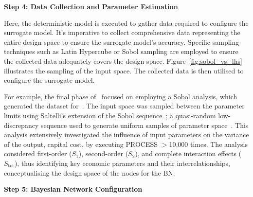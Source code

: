 \documentclass[journal]{IEEEtran}
\begin{document}
\textbf{Step 4: Data Collection and Parameter Estimation}

Here, the deterministic model is executed to gather data required to configure the surrogate model. It's imperative to collect comprehensive data representing the entire design space to ensure the surrogate model's accuracy. Specific sampling techniques such as Latin Hypercube or Sobol sampling are employed to ensure the collected data adequately covers the design space. Figure~\ref{fig:sobol_vs_lhs} illustrates the sampling of the input space. The collected data is then utilised to configure the surrogate model. 

For example, the final phase of~\cite{Hidalgo-Salaverri2023} focused on employing a Sobol analysis, which generated the dataset for~\cite{Griffiths2024}. The input space was sampled between the parameter limits using Saltelli's extension of the Sobol sequence~\cite{Sobol2001, Saltelli2002}; a quasi-random low-discrepancy sequence used to generate uniform samples of parameter space~\cite{Herman2023}. This analysis extensively investigated the influence of input parameters on the variance of the output, capital cost, by executing PROCESS $>$10,000 times. The analysis considered first-order ($S_{1}$), second-order ($S_{2}$), and complete interaction effects ($S_{\text{tot}}$), thus identifying key economic parameters and their interrelationships, conceptualising the design space of the nodes for the BN.\@

\textbf{Step 5: Bayesian Network Configuration}
\end{document}
